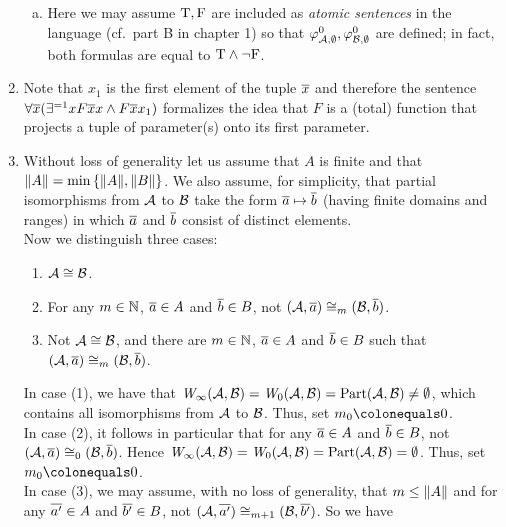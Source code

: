 \begin{enumerate}[1.]
\begin{enumerate}[(a)]
\item Here we may assume $\mathrm{T}, \mathrm{F}$ are included as \emph{atomic sentences} in the language (cf.\ part B in chapter 1) so that $\varphi^{0}_{\mathcal{A}, \emptyset}, \varphi^{0}_{\mathcal{B}, \emptyset}$ are defined; in fact, both formulas are equal to $\mathrm{T} \land \neg\mathrm{F}$.
\end{enumerate}
%
\item {} Note that $x_1$ is the first element of the tuple $\overline{x}$ and therefore the sentence $\forall \overline{x} (\exists^{= 1}x F\overline{x}x \land F\overline{x}x_1)$ formalizes the idea that $F$ is a (total) function that projects a tuple of parameter(s) onto its first parameter.
%
\item {} Without loss of generality let us assume that $A$ is finite and that $\|A\| = \min{\{\|A\|, \|B\|\}}$. We also assume, for simplicity, that partial isomorphisms from $\mathcal{A}$ to $\mathcal{B}$ take the form $\overline{a} \mapsto \overline{b}$ (having finite domains and ranges) in which $\overline{a}$ and $\overline{b}$ consist of distinct elements.
\medskip\\
Now we distinguish three cases:
\begin{enumerate}[(1)]
\item $\strct{A} \isom \strct{B}$.
\item For any $m \in \mathbb{N}$, $\overline{a} \in A$ and $\overline{b} \in B$, not $(\strct{A}, \vect{a}) \isom_m (\strct{B}, \vect{b})$.
\item Not $\strct{A} \isom \strct{B}$, and there are $m \in \mathbb{N}$, $\overline{a} \in A$ and $\overline{b} \in B$ such that $(\strct{A}, \vect{a}) \isom_m (\strct{B}, \vect{b})$.
\end{enumerate}
In case (1), we have that $\winpos{\infty}(\strct{A}, \strct{B}) = \winpos{0}(\strct{A}, \strct{B}) = \partisoms(\strct{A}, \strct{B}) \neq \emptyset$, which contains all isomorphisms from $\mathcal{A}$ to $\mathcal{B}$. Thus, set $m_0 \defas 0$.
\medskip\\
In case (2), it follows in particular that for any $\overline{a} \in A$ and $\overline{b} \in B$, not $(\strct{A}, \vect{a}) \isom_0 (\strct{B}, \vect{b})$. Hence $\winpos{\infty}(\strct{A}, \strct{B}) = \winpos{0}(\strct{A}, \strct{B}) = \partisoms(\strct{A}, \strct{B}) = \emptyset$. Thus, set $m_0 \defas 0$.
\medskip\\
In case (3), we may assume, with no loss of generality, that $m \leq \|A\|$ and for any $\overline{a'} \in A$ and $\overline{b'} \in B$, not $(\strct{A}, \vect{a'}) \isom_{m + 1} (\strct{B}, \vect{b'})$. So we have

\end{enumerate}
